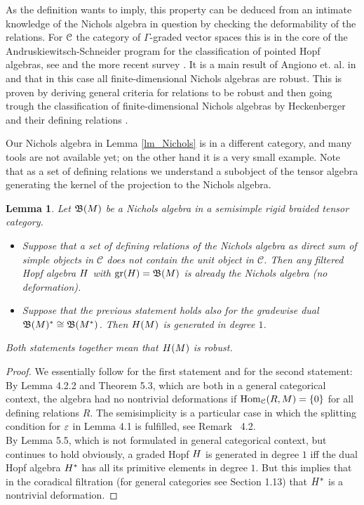 \documentclass[a4paper, reqno]{amsart}
\newtheorem{lemma}[theorem]{Lemma}
\theoremstyle{introTheorems}
\newcommand\cC{\mathcal{C}}
\newcommand{\gr}{\textup{gr}}
\newcommand\Hom{\textup{Hom}}
\renewcommand{\1}{\mathbbold{1}}
\begin{document}
As the definition wants to imply, this property can be deduced from an intimate knowledge of the Nichols algebra in question by checking the deformability of the relations. 
For $\mathcal{C}$ the category of $\Gamma$-graded vector spaces this is in the core of the Andruskiewitsch-Schneider program for the classification of pointed Hopf algebras, see 
\cites{AS10} and the more recent survey \cite{AG19}. It is a main result of Angiono et. al. in \cite{AG11} and \cite{AKM15} that in this case all finite-dimensional Nichols algebras are robust. This is proven by deriving general criteria for relations to be robust and then going trough the classification of finite-dimensional Nichols algebras by Heckenberger \cite{Heck09} and their defining relations \cite{An13}.

Our Nichols algebra in Lemma \ref{lm_Nichols} is in a different category, and many tools are not available yet; on the other hand it is a very small example. Note that as a set of defining relations we understand a subobject of the tensor algebra generating the kernel of the projection to the Nichols algebra.


\begin{lemma}\label{lm_robust}
Let $\mathfrak{B}(M)$ be a Nichols algebra in a semisimple rigid braided tensor category. 
\begin{itemize}
    \item Suppose that a set of defining relations of the Nichols algebra as direct sum of simple objects in $\cC$ does not contain the unit object in $\cC$. Then any filtered Hopf algebra $H$ with $\gr(\Nichols)=\NicholsOf(M)$ is already the Nichols algebra (no deformation).
    \item Suppose that the previous statement holds also for the gradewise dual $\mathfrak{B}(M)^*\cong\mathfrak{B}(M^*)$. Then $H(M)$ is generated in degree $1$.
\end{itemize}  
Both statements together mean that $H(M)$ is robust.
\end{lemma}
\begin{proof}
We essentially follow \cite{AKM15} for the first statement and \cite{AS00} for the second statement:\\

By \cite{MW09} Lemma 4.2.2 and \cite{AKM15} Theorem 5.3, which are both in a general categorical context, the algebra had no nontrivial deformations if $\Hom_\catC(R,M)=\{0\}$ for all defining relations $R$. The semisimplicity is a particular case in which the splitting condition for $\varepsilon$ in \cite{AKM15} Lemma 4.1 is fulfilled, see \cite{AKM15} Remark ~4.2.\\

By \cite{AS00} Lemma 5.5, which is not formulated in general categorical context, but continues to hold obviously, a graded Hopf $H$ is generated in degree $1$ iff the dual Hopf algebra $H^*$ has all its primitive elements in degree $1$. But this implies that in the coradical filtration (for general categories see \cite{EGNO15} Section 1.13) that $H^*$ is a nontrivial deformation. 
\end{proof}
\end{document}
